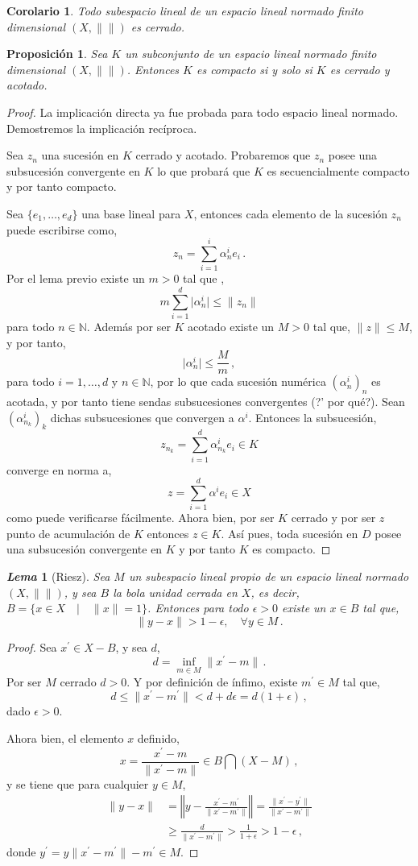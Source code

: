 \documentclass[12pt]{book}
\newtheorem{prop}{\bf Proposición}[chapter]
\newtheorem{lema}{\it Lema}[chapter]
\newtheorem{coro}{Corolario}[chapter]
\def\NN{\mathbb{N}}
\newcommand{\abs}[1]{\lvert #1\rvert }
\newcommand{\norm}[1]{\lVert #1\rVert }
\begin{document}
 \begin{coro} Todo subespacio lineal  de un espacio lineal normado finito dimensional $(X,\norm{})$  
es cerrado.
 \end{coro}
\begin{prop} Sea $K$ un subconjunto de un espacio lineal normado finito dimensional $(X,\norm{})
$. Entonces $K$ es compacto si y solo si $K$ es cerrado y acotado.
\end{prop}
\begin{proof}
La implicación directa ya fue probada para todo espacio lineal normado. Demostremos la 
implicación recíproca.

Sea $z_n$ una sucesión en $K$ cerrado y acotado. Probaremos que $z_n$ posee una 
subsucesión convergente en $K$ lo que probará que $K$ es secuencialmente compacto y por 
tanto compacto.


Sea $\{e_1,\dots,e_d\}$ una base lineal  para $X$, entonces cada elemento de la sucesión $z_n$ 
puede escribirse como,
$$z_n=\sum_{i=1}^i \alpha^i_ne_i\,.$$
Por el lema previo existe un $m>0$ tal que ,
$$m\sum_{i=1}^d\abs{\alpha_n^i}\leq\norm{z_n}$$
para todo $n\in \NN$. Además por ser $K$ acotado existe un $M>0$ tal que, $\norm{z}\leq M$, y 
por tanto,
$$\abs{\alpha_n^i}\leq \frac{M}{m}\,,$$
para todo $i=1,\dots,d$ y $n\in \NN$, por lo que cada sucesión numérica $(\alpha^i_n)_n$ es 
acotada, y por tanto tiene sendas subsucesiones convergentes (?' por qué?). Sean $
(\alpha^i_{n_k})_k$ dichas subsucesiones  que convergen a $\alpha^i$. Entonces la subsucesión,
$$z_{n_k} =\sum_{i=1}^d \alpha^i_{n_k}e_i\in K$$
converge  en  norma a,
$$z=\sum_{i=1}^d\alpha^ie_i \in X$$
como puede verificarse fácilmente. Ahora bien, por ser $K$  cerrado y por ser $z$ punto de 
acumulación de $K$ entonces $z\in K$. Así pues, toda sucesión en $D$ posee una subsucesión 
convergente en $K$ y por tanto $K$ es compacto.
\end{proof}  
\begin{lema}[Riesz]
Sea $M$ un subespacio lineal propio de un espacio lineal normado $(X,\norm{})$, y sea $B$ la 
bola unidad cerrada en $X$, es decir, $B=\{x\in X\quad|\quad \norm{x}=1\}$. Entonces para todo $
\epsilon>0$  existe un $x\in B$ tal que,
$$\norm{y-x}> 1-\epsilon,\quad \forall y\in M\,.$$
\end{lema} 
\begin{proof}
Sea $x^\prime\in X-B$, y sea $d$,
$$d=\inf_{m\in M} \norm{x^\prime-m}\,.$$
Por ser $M$ cerrado $d>0$. Y por definición de ínfimo, existe $m^\prime\in M$ tal que,
$$d\leq\norm{x^\prime-m^\prime} < d+d\epsilon=d(1+\epsilon)\,,$$
dado $\epsilon>0$.

Ahora bien, el elemento $x$ definido,
$$ x=\frac{x^\prime-m}{\norm{x^\prime-m}}\in B\bigcap (X-M)\,,$$
y se tiene que para cualquier $y\in M$,
\begin{align*}
\norm{y-x}&=\left\Vert  y -\frac{x^\prime -m^\prime}{\norm{x^\prime - m^\prime}}\right\Vert 
=\frac{\norm{x^\prime-y^\prime}}{\norm{x^\prime-m^\prime}}\\
&\geq\frac{d}{\norm{x^\prime-m^\prime}} >\frac{1}{1+\epsilon}>1-\epsilon\,,
\end{align*}
donde $ y^\prime=y\norm{x^\prime-m^\prime}-m^\prime\in M$.
\end{proof}
\end{document}
